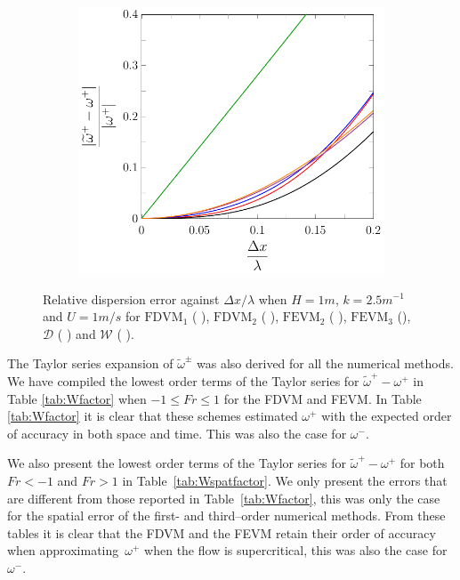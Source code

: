 \begin{figure}
\begin{subfigure}{0.5\textwidth}
	\end{subfigure}
	\par\bigskip
	\begin{subfigure}{0.5\textwidth}
		\includegraphics[width=\textwidth]{./chp4/figures/New/Dispu1Fill.pdf}
	\end{subfigure}
	\caption{Relative dispersion error against $\Delta x / \lambda$ when $H = 1m$, $k = 2.5m^{-1}$ and $U = 1m/s$ for $\text{FDVM}_1$ ({\color{green!60!black} \solidrule}), $\text{FDVM}_2$ ({\color{red} \solidrule}), $\text{FEVM}_2$ ({\color{blue} \solidrule}), $\text{FEVM}_3$ ({\solidrule}), $\mathcal{D}$ ({\color{violet!80!white} \solidrule}) and $\mathcal{W}$ ({\color{orange} \solidrule}).}
	\label{fig:Dispu1Fill}
\end{figure}

The Taylor series expansion of $\widetilde{\omega}^\pm$ was also derived for all the numerical methods. We have compiled the lowest order terms of the Taylor series for ${\widetilde{\omega}^+-\omega^+}$ in Table \ref{tab:Wfactor} when $ -1 \le Fr \le 1$ for the FDVM and FEVM. In Table \ref{tab:Wfactor} it is clear that these schemes estimated $\omega^+$ with the expected order of accuracy in both space and time. This was also the case for $\omega^-$.

We also present the lowest order terms of the Taylor series for ${\widetilde{\omega}^+-\omega^+}$ for both $ Fr < -1$ and $ Fr > 1$ in Table~\ref{tab:Wspatfactor}. We only present the errors that are different from those reported in Table~\ref{tab:Wfactor}, this was only the case for the spatial error of the first- and third--order numerical methods. From these tables it is clear that the FDVM and the FEVM retain their order of accuracy when approximating~$\omega^+$ when the flow is supercritical, this was also the case for $\omega^-$. 

